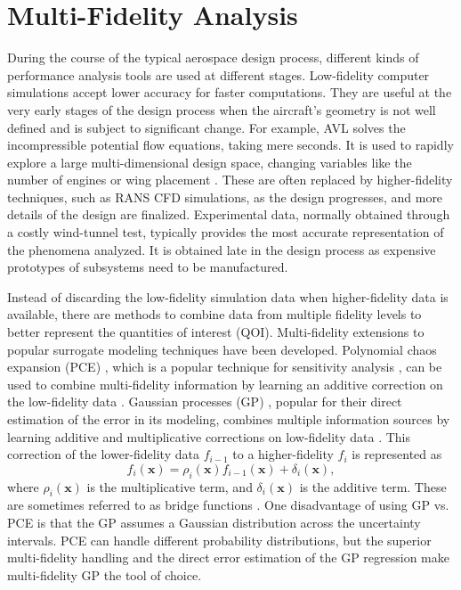 \section{Multi-Fidelity Analysis} \label{intro_mf}

During the course of the typical aerospace design process, different kinds of performance analysis tools are used at different stages.
Low-fidelity computer simulations accept lower accuracy for faster computations.
They are useful at the very early stages of the design process when the aircraft's geometry is not well defined and is subject to significant change.
For example, AVL \cite{drela2008athena} solves the incompressible potential flow equations, taking mere seconds.
It is used to rapidly explore a large multi-dimensional design space, changing variables like the number of engines or wing placement \cite{botero2016suave,botero2019generative}.
These are often replaced by higher-fidelity techniques, such as RANS CFD simulations, as the design progresses, and more details of the design are finalized.
Experimental data, normally obtained through a costly wind-tunnel test, typically provides the most accurate representation of the phenomena analyzed.
It is obtained late in the design process as expensive prototypes of subsystems need to be manufactured.

Instead of discarding the low-fidelity simulation data when higher-fidelity data is available, there are methods to combine data from multiple fidelity levels to better represent the quantities of interest (QOI).
Multi-fidelity extensions to popular surrogate modeling techniques have been developed.
Polynomial chaos expansion (PCE) \cite{oladyshkin2012data,blatman2011adaptive}, which is a popular technique for sensitivity  analysis \cite{sudret2008global,crestaux2009polynomial}, can be used to combine multi-fidelity information by learning an additive correction on the low-fidelity data \cite{ng2012multifidelity, palar2018global}.
Gaussian processes (GP) \cite{krige1951statistical,matheron1963principles,rasmussen_gaussian_2006}, popular for their direct estimation of the error in its modeling, combines multiple information sources by learning additive and multiplicative corrections on low-fidelity data \cite{kennedy_predicting_2000}.
This correction of the lower-fidelity data $f_{i-1}$ to a higher-fidelity $f_i$ is represented as
\begin{equation}
    f_i(\mathbf{x}) = \rho_i(\mathbf{x}) f_{i-1}(\mathbf{x}) + \delta_i(\mathbf{x}),
\end{equation}
where $\rho_i(\mathbf{x})$ is the multiplicative term, and $\delta_i(\mathbf{x})$ is the additive term.
These are sometimes referred to as bridge functions \cite{han_improving_2013}.
One disadvantage of using GP vs. PCE is that the GP assumes a Gaussian distribution across the uncertainty intervals. 
PCE can handle different probability distributions, but the superior multi-fidelity handling and the direct error estimation of the GP regression make multi-fidelity GP the tool of choice.

